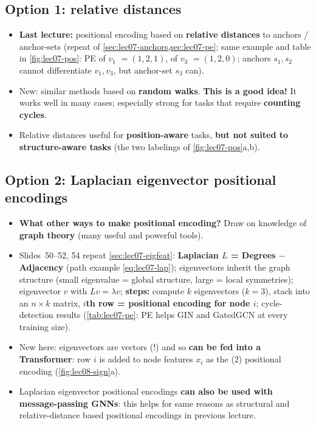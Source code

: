 \subsection{Option 1: relative distances}\label{sec:lec08-reldist}

\begin{itemize}
  \item \textbf{Last lecture:} positional encoding based on \textbf{relative
    distances} to anchors / anchor-sets (repeat of \cref{sec:lec07-anchors,sec:lec07-pe};
    same example and table in \cref{fig:lec07-pos}: PE of $v_1$ $=(1,2,1)$, of
    $v_3$ $=(1,2,0)$; anchors $s_1,s_2$ cannot differentiate $v_1,v_3$, but
    anchor-set $s_3$ can).
  \item New: similar methods based on \textbf{random walks}. \textbf{This is a
    good idea!} It works well in many cases; especially strong for tasks that
    require \textbf{counting cycles}.
  \item Relative distances useful for \textbf{position-aware} tasks, \textbf{but
    not suited to structure-aware tasks} (the two labelings of
    \cref{fig:lec07-pos}a,b).
\end{itemize}

\subsection{Option 2: Laplacian eigenvector positional encodings}\label{sec:lec08-lappe}

\begin{itemize}
  \item \textbf{What other ways to make positional encoding?} Draw on knowledge
    of \textbf{graph theory} (many useful and powerful tools).
  \item Slides~50--52, 54 repeat \cref{sec:lec07-eigfeat}: \textbf{Laplacian
    $L$ = Degrees $-$ Adjacency} (path example \cref{eq:lec07-lap}); eigenvectors
    inherit the graph structure (small eigenvalue = global structure, large =
    local symmetries); eigenvector $v$ with $Lv=\lambda v$; \textbf{steps:}
    compute $k$ eigenvectors ($k=3$), stack into an $n\times k$ matrix, \textbf{$i$th
    row = positional encoding for node $i$}; cycle-detection results
    (\cref{tab:lec07-pe}: PE helps GIN and GatedGCN at every training size).
  \item New here: eigenvectors are vectors (!) and so \textbf{can be fed into a
    Transformer}: row $i$ is added to node features $x_i$ as the (2) positional
    encoding (\cref{fig:lec08-sign}a).
  \item Laplacian eigenvector positional encodings \textbf{can also be used with
    message-passing GNNs}: this helps for same reasons as structural and
    relative-distance based positional encodings in previous lecture.
\end{itemize}

